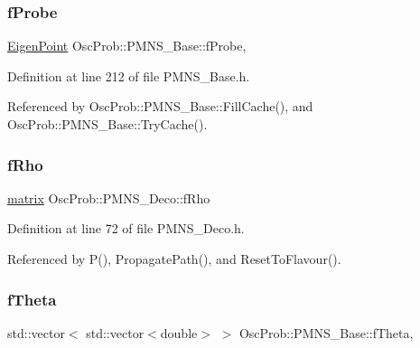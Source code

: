 \subsubsection{\texorpdfstring{f\+Probe}{fProbe}}
{\footnotesize\ttfamily \hyperlink{structOscProb_1_1EigenPoint}{Eigen\+Point} Osc\+Prob\+::\+P\+M\+N\+S\+\_\+\+Base\+::f\+Probe\hspace{0.3cm}{\ttfamily [protected]}, {\ttfamily [inherited]}}



Definition at line 212 of file P\+M\+N\+S\+\_\+\+Base.\+h.



Referenced by Osc\+Prob\+::\+P\+M\+N\+S\+\_\+\+Base\+::\+Fill\+Cache(), and Osc\+Prob\+::\+P\+M\+N\+S\+\_\+\+Base\+::\+Try\+Cache().

\mbox{\label{classOscProb_1_1PMNS__Deco_a0488d62b4ef4cf5b43425769f5fcdbdf}} 
\subsubsection{\texorpdfstring{f\+Rho}{fRho}}
{\footnotesize\ttfamily \hyperlink{classOscProb_1_1PMNS__Deco_a77b4e0c041b6268910a270be0f5387c9}{matrix} Osc\+Prob\+::\+P\+M\+N\+S\+\_\+\+Deco\+::f\+Rho\hspace{0.3cm}{\ttfamily [protected]}}



Definition at line 72 of file P\+M\+N\+S\+\_\+\+Deco.\+h.



Referenced by P(), Propagate\+Path(), and Reset\+To\+Flavour().

\mbox{\label{classOscProb_1_1PMNS__Base_a1976887cd658dd86b2336c181f1470b4}} 
\subsubsection{\texorpdfstring{f\+Theta}{fTheta}}
{\footnotesize\ttfamily std\+::vector$<$ std\+::vector$<$double$>$ $>$ Osc\+Prob\+::\+P\+M\+N\+S\+\_\+\+Base\+::f\+Theta\hspace{0.3cm}{\ttfamily [protected]}, {\ttfamily [inherited]}}



